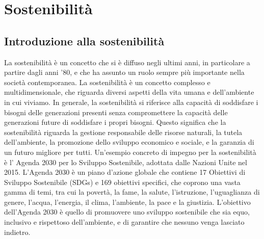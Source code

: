 \section{Sostenibilità}

\subsection{Introduzione alla sostenibilità}

La sostenibilità è un concetto che si è diffuso negli ultimi anni, in particolare a partire dagli anni '80, e che ha assunto un ruolo sempre più importante nella società contemporanea. La sostenibilità è un concetto complesso e multidimensionale, che riguarda diversi aspetti della vita umana e dell'ambiente in cui viviamo. In generale, la sostenibilità si riferisce alla capacità di soddisfare i bisogni delle generazioni presenti senza compromettere la capacità delle generazioni future di soddisfare i propri bisogni. Questo significa che la sostenibilità riguarda la gestione responsabile delle risorse naturali, la tutela dell'ambiente, la promozione dello sviluppo economico e sociale, e la garanzia di un futuro migliore per tutti.
Un'esempio concreto di impegno per la sostenibilità è l' Agenda 2030 per lo Sviluppo Sostenibile, adottata dalle Nazioni Unite nel 2015. L'Agenda 2030 è un piano d'azione globale che contiene 17 Obiettivi di Sviluppo Sostenibile (SDGs) e 169 obiettivi specifici, che coprono una vasta gamma di temi, tra cui la povertà, la fame, la salute, l'istruzione, l'uguaglianza di genere, l'acqua, l'energia, il clima, l'ambiente, la pace e la giustizia. L'obiettivo dell'Agenda 2030 è quello di promuovere uno sviluppo sostenibile che sia equo, inclusivo e rispettoso dell'ambiente, e di garantire che nessuno venga lasciato indietro.


